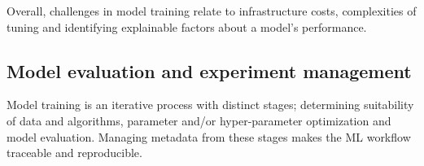 
Overall, challenges in model training relate to infrastructure costs, complexities of tuning and identifying explainable factors about a model's performance. 

\subsection{Model evaluation and experiment management}
Model training is an iterative process with distinct stages; determining suitability of data and algorithms, parameter and/or hyper-parameter optimization and model evaluation. Managing metadata from these stages makes the ML workflow traceable and reproducible.

